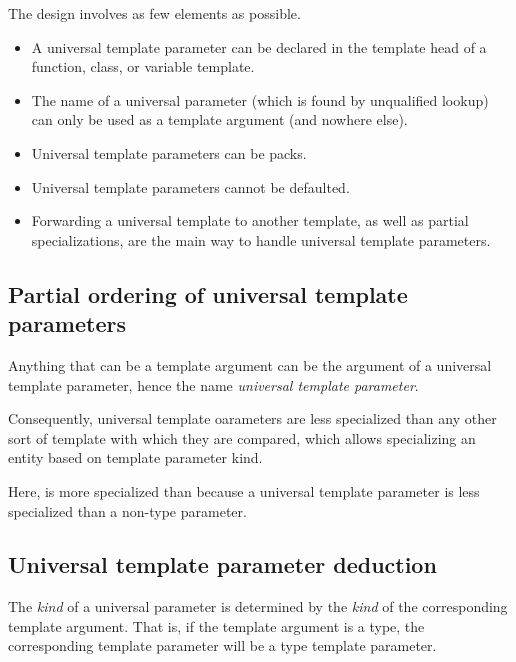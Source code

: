 \documentclass{wg21}
\begin{document}
The design involves as few elements as possible.
\begin{itemize}
\item A universal template parameter can be declared in the template head of a function, class, or variable template.
\item The name of a universal parameter (which is found by unqualified lookup) can only be used as a template argument (and nowhere else).
\item Universal template parameters can be packs.
\item Universal template parameters cannot be defaulted.
\item Forwarding a universal template to another template, as well as partial specializations, are the main way to handle universal template parameters.
\end{itemize}

\subsection{Partial ordering of universal template parameters}

Anything that can be a template argument can be the argument of a universal template parameter, hence the name \emph{universal template parameter}.

Consequently, universal template oarameters are less specialized than any other sort of template with which they are compared,
which allows specializing an entity based on template parameter kind.


Here,  is more specialized than  because a universal template parameter is less specialized than a non-type parameter.

\subsection{Universal template parameter deduction}

The \emph{kind} of a universal parameter is determined by the \emph{kind} of the corresponding template argument.
That is, if the template argument is a type, the corresponding template parameter will be a type template parameter.
\end{document}
